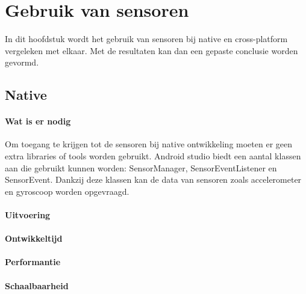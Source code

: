 
\chapter{Gebruik van sensoren}%
\label{ch:sensoren}

In dit hoofdstuk wordt het gebruik van sensoren bij native en cross-platform vergeleken met elkaar. 
Met de resultaten kan dan een gepaste conclusie worden gevormd.

\section{Native}
\subsubsection{Wat is er nodig}
Om toegang te krijgen tot de sensoren bij native ontwikkeling moeten er geen extra libraries of tools worden gebruikt.
Android studio biedt een aantal klassen aan die gebruikt kunnen worden: SensorManager, 
SensorEventListener en SensorEvent. Dankzij deze klassen kan de data van sensoren zoals accelerometer en 
gyroscoop worden opgevraagd.

\subsubsection{Uitvoering}



\subsubsection{Ontwikkeltijd}



\subsubsection{Performantie}



\subsubsection{Schaalbaarheid}

